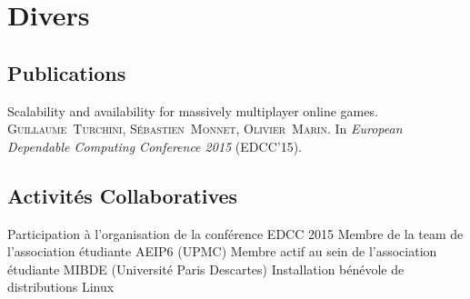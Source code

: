 \documentclass[11pt,a4paper,sans]{moderncv}
\begin{document}
\vspace{0.5em}


\section{Divers}
\vspace{0.3em}

\subsection{Publications}
\vspace{1em}

       {
            Scalability and availability for massively multiplayer online games.\endgraf
            \textsc{Guillaume~Turchini, Sébastien~Monnet, Olivier~Marin}.\endgraf
            In \textit{European Dependable Computing Conference 2015} (EDCC'15).
       }
       
\vspace{0.5em}

\subsection{Activités Collaboratives}
\vspace{1em}

       {Participation à l'organisation de la conférence EDCC 2015}
       {Membre de la team de l'association étudiante AEIP6 (UPMC)}
       {Membre actif au sein de l'association étudiante MIBDE (Université Paris Descartes)}
       {Installation bénévole de distributions Linux}
\end{document}
